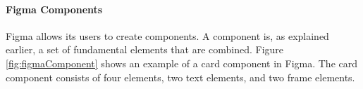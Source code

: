 \paragraph{Figma Components}%
\label{ssub:Figma Components}
Figma allows its users to create \glspl{component}. A \gls{component} is, as explained earlier, a set of fundamental elements that are combined. Figure \ref{fig:figmaComponent} shows an example of a card \cite{babichSimpleDesignTips2020} \gls{component} in Figma. The card \gls{component} consists of four elements, two text elements, and two frame elements.



